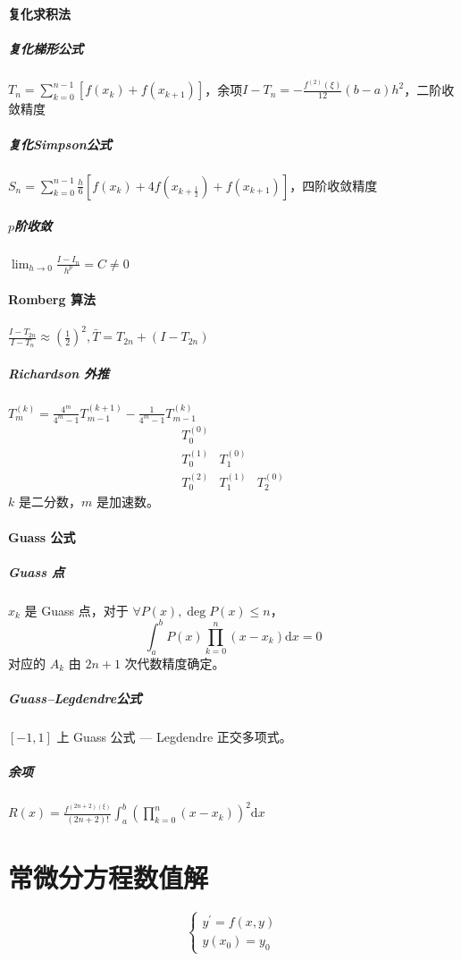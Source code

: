 \documentclass[twocolumn]{ctexart}
\def\dd{\mathrm{d}}
\begin{document}
\paragraph{复化求积法}
\subparagraph{复化梯形公式} $T_n=\sum_{k=0}^{n-1}[f(x_{k})+f(x_{k+1})]$，余项$I-T_n=-\frac{f^{(2)}(\xi)}{12}(b-a)h^2$，二阶收敛精度
\subparagraph{复化Simpson公式} $S_n=\sum_{k=0}^{n-1}\frac{h}{6}[f(x_k)+4f\left(x_{k+\frac{1}{2}}\right)+f(x_{k+1})]$，四阶收敛精度
\subparagraph{$p$阶收敛} $\lim_{h\rightarrow 0}\frac{I-I_n}{h^p}=C\neq 0$

\paragraph{Romberg 算法} $\frac{I-T_{2n}}{I-T_{n}}\approx \left(\frac{1}{2}\right)^2,\bar{T}=T_{2n}+(I-T_{2n})$
\subparagraph{Richardson 外推} $T_m^{(k)}=\frac{4^m}{4^m-1}T_{m-1}^{(k+1)}-\frac{1}{4^m-1}T_{m-1}^{(k)}$
\begin{equation*}
    \begin{array}{ccc}
        T_0^{(0)} \\
        T_0^{(1)} & T_1^{(0)} \\
        T_0^{(2)} & T_1^{(1)} & T_2^{(0)}
    \end{array}
\end{equation*}
$k$ 是二分数，$m$ 是加速数。

\paragraph{Guass 公式}
\subparagraph{Guass 点} $x_k$ 是 Guass 点，对于 $\forall P(x), \deg P(x)\leq n$，
\begin{equation*}
    \int_a^b P(x)\prod_{k=0}^n(x-x_k)\dd x=0
\end{equation*} 对应的 $A_k$ 由 $2n+1$ 次代数精度确定。
\subparagraph{Guass--Legdendre公式} $[-1,1]$ 上 Guass 公式 --- Legdendre 正交多项式。
\subparagraph{余项} $R(x)=\frac{f^{(2n+2)(\xi)}}{(2n+2)!}\int_a^b \left(\prod_{k=0}^n (x-x_k)\right)^2\dd x$


\section{常微分方程数值解}

\begin{equation*}
    \begin{cases}
        y^\prime=f(x,y)\\
        y(x_0)=y_0
    \end{cases}
\end{equation*}
\end{document}
